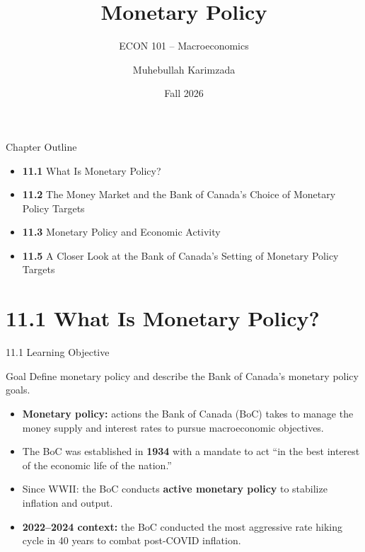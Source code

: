 \documentclass[aspectratio=169]{beamer}
\title{\textbf{Monetary Policy}}
\subtitle{{\large ECON 101 -- Macroeconomics}}
\author{Muhebullah Karimzada}
\date{Fall 2026}
\begin{document}

\begin{frame}[plain]
  \titlepage
\end{frame}

\begin{frame}{Chapter Outline}
\transfade
\begin{itemize}[<+->]
  \item \textbf{11.1} What Is Monetary Policy?
  \item \textbf{11.2} The Money Market and the Bank of Canada's Choice of Monetary Policy Targets
  \item \textbf{11.3} Monetary Policy and Economic Activity
  \item \textbf{11.5} A Closer Look at the Bank of Canada's Setting of Monetary Policy Targets
\end{itemize}
\end{frame}

\section{11.1 What Is Monetary Policy?}

\begin{frame}{11.1 Learning Objective}
\transfade
\begin{block}{Goal}
Define monetary policy and describe the Bank of Canada's monetary policy goals.
\end{block}
\begin{itemize}[<+->]
  \item \textbf{Monetary policy:} actions the Bank of Canada (BoC) takes to manage the money supply and interest rates to pursue macroeconomic objectives.
  \item The BoC was established in \textbf{1934} with a mandate to act ``in the best interest of the economic life of the nation.''
  \item Since WWII: the BoC conducts \textbf{active monetary policy} to stabilize inflation and output.
  \item \textbf{2022--2024 context:} the BoC conducted the most aggressive rate hiking cycle in 40 years to combat post-COVID inflation.
\end{itemize}
\end{frame}
\end{document}
